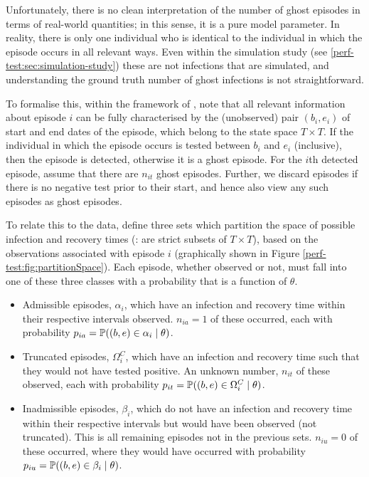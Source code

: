 \documentclass[thesis.tex]{subfiles}
\begin{document}
Unfortunately, there is no clean interpretation of the number of ghost episodes in terms of real-world quantities; in this sense, it is a pure model parameter.
In reality, there is only one individual who is identical to the individual in which the episode occurs in all relevant ways.
Even within the simulation study (see \cref{perf-test:sec:simulation-study}) these are not infections that are simulated, and understanding the ground truth number of ghost infections is not straightforward.

To formalise this, within the framework of \textcite{heiseyModelling}, note that all relevant information about episode $i$ can be fully characterised by the (unobserved) pair $(b_i, e_i)$ of start and end dates of the episode, which belong to the state space $T \times T$.
If the individual in which the episode occurs is tested between $b_i$ and $e_i$ (inclusive), then the episode is detected, otherwise it is a ghost episode.
For the $i$th detected episode, assume that there are $n_{it}$ ghost episodes.
Further, we discard episodes if there is no negative test prior to their start, and hence also view any such episodes as ghost episodes.

To relate this to the data, define three sets which partition the space of possible infection and recovery times (\ie: are strict subsets of $T \times T$), based on the observations associated with episode $i$ (graphically shown in Figure \ref{perf-test:fig:partitionSpace}).
Each episode, whether observed or not, must fall into one of these three classes with a probability that is a function of $\theta$.

\begin{itemize}
\item
  Admissible episodes, $\alpha_i$, which have an infection and
  recovery time within their respective intervals observed.
  $n_{ia} =1$ of these occurred, each with probability
  $p_{ia} = \operatorname{\mathbb{P}}((b, e) \in \alpha_i \mid \theta)$.
\item
  Truncated episodes, $\Omega_i^C$, which have an infection and
  recovery time such that they would not have tested positive. An
  unknown number, $n_{it}$ of these observed, each with probability
  $p_{it} = \operatorname{\mathbb{P}}((b, e) \in \Omega^C_i \mid \theta)$.
\item
  Inadmissible episodes, $\beta_i$, which do not have an infection and
  recovery time within their respective intervals but would have been
  observed (not truncated). This is all remaining episodes not in the
  previous sets. $n_{iu} = 0$ of these occurred, where they would have
  occurred with probability
  $p_{iu} = \operatorname{\mathbb{P}}((b, e) \in \beta_i \mid \theta)$.
\end{itemize}
\end{document}
